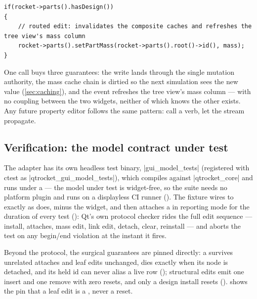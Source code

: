\begin{verbatim}
if(rocket->parts().hasDesign())
{
    // routed edit: invalidates the composite caches and refreshes the tree view's mass column
    rocket->parts().setPartMass(rocket->parts().root()->id(), mass);
}
\end{verbatim}

One call buys three guarantees: the write lands through the single mutation authority, the mass
cache chain is dirtied so the next simulation sees the new value (\cref{sec:caching}), and the
 event refreshes the tree view's mass column --- with no coupling between the two
widgets, neither of which knows the other exists. Any future property editor follows the same
pattern: call a verb, let the stream propagate.

\subsection{Verification: the model contract under test}\label{sec:gui-verification}

The adapter has its own headless test binary, \cppinline|gui_model_tests| (registered with ctest
as \cppinline|qtrocket_gui_model_tests|), which compiles  against
\cppinline|qtrocket_core| and runs under a  --- the model under test is
widget-free, so the suite needs no platform plugin and runs on a displayless CI runner
(). The fixture wires  to
 exactly as  does, minus the widget, and then attaches
a  in  reporting mode for the duration of every test
(): Qt's own protocol checker rides the full edit
sequence --- install, attaches, mass edit, link edit, detach, clear, reinstall --- and aborts the
test on any begin/end violation at the instant it fires.

Beyond the protocol, the surgical guarantees are pinned directly: a
 survives unrelated attaches and leaf edits unchanged, dies exactly
when its node is detached, and its held id can never alias a live row
(); structural edits emit one insert and one remove
with zero resets, and only a design install resets
().  shows the pin that a leaf
edit is a , never a reset.

